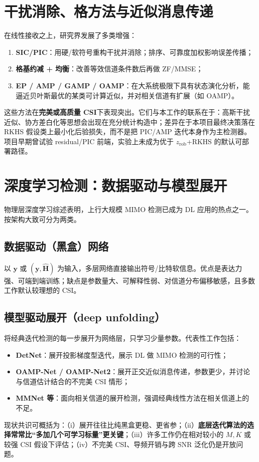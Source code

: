 \section{干扰消除、格方法与近似消息传递}

在线性接收之上，研究界发展了多类增强：
\begin{enumerate}[leftmargin=2em]
  \item \textbf{SIC/PIC}：用硬/软符号重构干扰并消除；排序、可靠度加权影响误差传播；
  \item \textbf{格基约减 + 均衡}：改善等效信道条件数后再做 ZF/MMSE；
  \item \textbf{EP / AMP / GAMP / OAMP}：在大系统极限下具有状态演化分析，能逼近贝叶斯最优的某类可计算近似，并对相关信道有扩展（如 OAMP）\cite{he2018}。
\end{enumerate}
这些方法在\textbf{完美或高质量 CSI}下表现突出。它们与本工作的联系在于：高斯干扰近似、协方差白化等思想会出现在充分统计构造中；差异在于本项目最终决策落在 RKHS 假设类上最小化后验损失，而不是把 PIC/AMP 迭代本身作为主检测器。项目早期曾试验 residual/PIC 前端，实验上未成为优于 $z_{\mathrm{rob}}$+RKHS 的默认可部署路径。

\section{深度学习检测：数据驱动与模型展开}

物理层深度学习综述表明，上行大规模 MIMO 检测已成为 DL 应用的热点之一\cite{o2017}。按架构大致可分为两类\cite{samuel2019,he2018,khani2020}。

\subsection{数据驱动（黑盒）网络}
以 $\mathbf{y}$ 或 $(\mathbf{y},\hat{\mathbf{H}})$ 为输入，多层网络直接输出符号/比特软信息。优点是表达力强、可端到端训练；缺点是参数量大、可解释性弱、对信道分布偏移敏感，且多数工作默认较理想的 CSI。

\subsection{模型驱动展开（deep unfolding）}
将经典迭代检测的每一步展开为网络层，只学习少量参数。代表性工作包括：
\begin{itemize}
  \item \textbf{DetNet}：展开投影梯度型迭代，展示 DL 做 MIMO 检测的可行性\cite{samuel2019}；
  \item \textbf{OAMP-Net / OAMP-Net2}：展开正交近似消息传递，参数更少，并讨论与信道估计结合的不完美 CSI 情形\cite{he2018}；
  \item \textbf{MMNet 等}：面向相关信道的展开检测，强调经典线性方法在相关信道上的不足\cite{khani2020}。
\end{itemize}
现状共识可概括为：（i）展开往往比纯黑盒更稳、更省参；（ii）\textbf{底层迭代算法的选择常常比“多加几个可学习标量”更关键}；（iii）许多工作仍在相对较小的 $M,K$ 或较强 CSI 假设下评估；（iv）不完美 CSI、导频开销与跨 SNR 泛化仍是开放问题。

